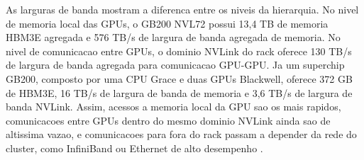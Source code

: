 As larguras de banda mostram a diferenca entre os niveis da hierarquia. No nivel
de memoria local das GPUs, o GB200 NVL72 possui 13,4 TB de memoria HBM3E agregada
e 576 TB/s de largura de banda agregada de memoria. No nivel de comunicacao entre
GPUs, o dominio NVLink do rack oferece 130 TB/s de largura de banda agregada para
comunicacao GPU-GPU. Ja um superchip GB200, composto por uma CPU Grace e duas
GPUs Blackwell, oferece 372 GB de HBM3E, 16 TB/s de largura de banda de memoria e
3,6 TB/s de largura de banda NVLink. Assim, acessos a memoria local da GPU sao os
mais rapidos, comunicacoes entre GPUs dentro do mesmo dominio NVLink ainda sao de
altissima vazao, e comunicacoes para fora do rack passam a depender da rede do
cluster, como InfiniBand ou Ethernet de alto desempenho \cite{nvidiagb200nvl72}.
